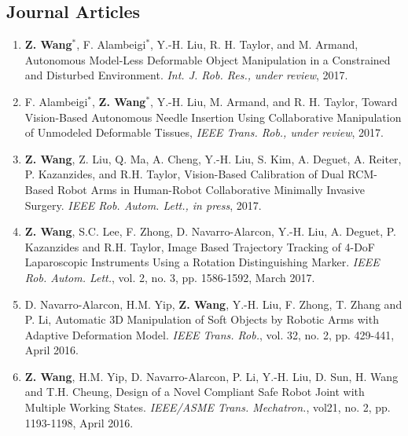 \documentclass[10pt,letterpaper]{article}
\begin{document}
\subsection*{Journal Articles}
\begin{enumerate}
\item \textbf{Z. Wang}$^*$, F. Alambeigi$^*$, Y.-H. Liu, R. H. Taylor, and M. Armand,
  Autonomous Model-Less Deformable Object Manipulation in a Constrained and Disturbed Environment.
  \textit{Int. J. Rob. Res., under review}, 2017.
\item F. Alambeigi$^*$, \textbf{Z. Wang}$^*$, Y.-H. Liu, M. Armand, and R. H. Taylor,
  Toward Vision-Based Autonomous Needle Insertion Using Collaborative Manipulation of Unmodeled Deformable Tissues,
  \textit{{IEEE} Trans. Rob., under review}, 2017.
\item \textbf{Z. Wang}, Z. Liu, Q. Ma, A. Cheng, Y.-H. Liu, S. Kim, A. Deguet, A. Reiter, P. Kazanzides, and R.H. Taylor,
  Vision-Based Calibration of Dual RCM-Based Robot Arms in Human-Robot Collaborative Minimally Invasive Surgery.
  \textit{IEEE Rob. Autom. Lett., in press}, 2017.
\item \textbf{Z. Wang}, S.C. Lee, F. Zhong, D. Navarro-Alarcon, Y.-H. Liu, A. Deguet, P. Kazanzides and R.H. Taylor,
  Image Based Trajectory Tracking of 4-DoF Laparoscopic Instruments Using a Rotation Distinguishing Marker.
  \textit{IEEE Rob. Autom. Lett.}, vol. 2, no. 3, pp. 1586-1592, March 2017.
\item D. Navarro-Alarcon, H.M. Yip, \textbf{Z. Wang}, Y.-H. Liu, F. Zhong, T. Zhang and P. Li,
  Automatic 3D Manipulation of Soft Objects by Robotic Arms with Adaptive Deformation Model.
  \textit{{IEEE} Trans. Rob.}, vol. 32, no. 2, pp. 429-441, April 2016.
\item \textbf{Z. Wang}, H.M. Yip, D. Navarro-Alarcon, P. Li, Y.-H. Liu, D. Sun, H. Wang and T.H. Cheung,
  Design of a Novel Compliant Safe Robot Joint with Multiple Working States.
  \textit{{IEEE/ASME} Trans. Mechatron.}, vol21, no. 2, pp. 1193-1198, April 2016.
\end{enumerate}
\end{document}
